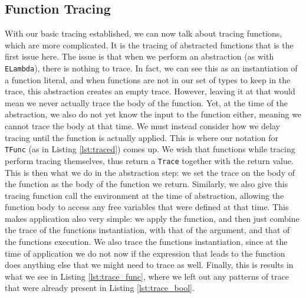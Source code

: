     \subsection{Function Tracing} \label{sec:functions}
        With our basic tracing established, we can now talk about tracing functions, which are more complicated.
        It is the tracing of abstracted functions that is the first issue here.
        The issue is that when we perform an abstraction (as with \texttt{ELambda}), there is nothing to trace.
        In fact, we can see this as an instantiation of a function literal, and when functions are not in our set of types to keep in the trace, this abstraction creates an empty trace.
        However, leaving it at that would mean we never actually trace the body of the function.
        Yet, at the time of the abstraction, we also do not yet know the input to the function either, meaning we cannot trace the body at that time.
        We must instead consider how we delay tracing until the function is actually applied.
        This is where our notation for \texttt{TFunc} (as in Listing \ref{lst:traced}) comes up.
        We wish that functions while tracing perform tracing themselves, thus return a \texttt{Trace} together with the return value.
        This is then what we do in the abstraction step: we set the trace on the body of the function as the body of the function we return.
        Similarly, we also give this tracing function call the environment at the time of abstraction, allowing the function body to access any free variables that were defined at that time.
        This makes application also very simple: we apply the function, and then just combine the trace of the functions instantiation, with that of the argument, and that of the functions execution.
        We also trace the functions instantiation, since at the time of application we do not now if the expression that leads to the function does anything else that we might need to trace as well.
        Finally, this is results in what we see in Listing \ref{lst:trace_func}, where we left out any patterns of trace that were already present in Listing \ref{lst:trace_bool}.

